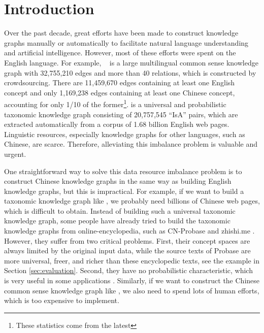 \section{Introduction}
\label{sec:intro}

Over the past decade, great efforts have been made to construct knowledge graphs manually or automatically to facilitate natural language understanding and artificial intelligence.
However, most of these efforts were spent on the English language. 
For example,
\con~\cite{Speer2012a} is a large multilingual common sense knowledge graph with 32,755,210 edges and more than 40 relations, 
which is constructed by crowdsourcing. There are 11,459,670 edges containing at least one English concept and only 1,169,238 
edges containing at least one Chinese concept, accounting for only 1/10 of the former\footnote{These statistics come from the latest }.
\pro \cite{Wu2012} is a universal and probabilistic taxonomic knowledge graph consisting of 20,757,545 ``IsA'' pairs, 
which are extracted automatically from a corpus of 1.68 billion English web pages. 
Linguistic resources, especially knowledge graphs for other languages, such as Chinese, are scarce. 
Therefore, alleviating this imbalance problem is valuable and urgent.

One straightforward way to solve this data resource imbalance problem is to construct 
Chinese knowledge graphs in the same way as building English knowledge graphs, 
but this is impractical. 
For example, if we want to build a taxonomic knowledge graph like \pro, 
we probably need billions of Chinese web pages, which is difficult to obtain. 
Instead of building such a universal taxonomic knowledge graph, some people have 
already tried to build the taxonomic knowledge graphs from online-encyclopedia, 
such as CN-Probase \cite{Xu2017} and zhishi.me \cite{Niu2011}. 
However, they suffer from two critical problems. 
First, their concept spaces are always limited by the original input data, 
while the source texts of Probase 
are more universal, freer, and richer than these encyclopedic texts, see the example in Section \ref{sec:evaluation}. 
Second, they have no probabilistic characteristic, which is very useful in some applications \cite{Cui2016,Song-ijcai-2011}.
Similarly, if we want to construct the Chinese common sense knowledge graph like \con, we also need to spend lots of human efforts, which is too expensive to implement.


